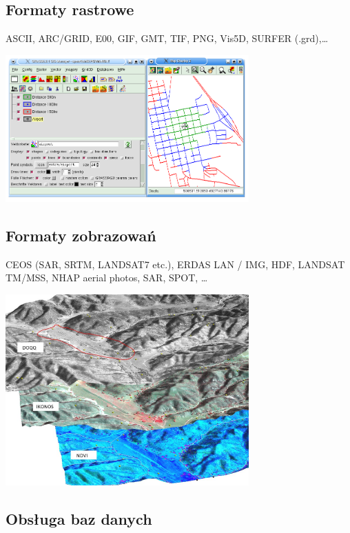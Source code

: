 \documentclass[notumble,a4paper,10pt,nofoldmark]{leaflet}
\newenvironment{myfig}[1][0pt plus 1.5ex minus .5ex]{\par\vspace*{#1}\begin{minipage}{\textwidth}\centering}{\end{minipage}}
\begin{document}
\subsection{Formaty rastrowe}
ASCII, ARC/GRID, E00, GIF, GMT, TIF, PNG, Vis5D, SURFER (.grd),\dots
\begin{myfig}
\includegraphics[width=0.7\textwidth]{isodist}
\end{myfig}

\subsection{Formaty zobrazowań}

CEOS (SAR, SRTM, LANDSAT7 etc.), ERDAS LAN / IMG, HDF, LANDSAT TM/MSS, NHAP aerial photos, SAR, SPOT, \dots
\begin{myfig}[1.5ex]
\includegraphics[width=0.7\textwidth]{ndvi}
\end{myfig}

\subsection{Obsługa baz danych}
\end{document}

